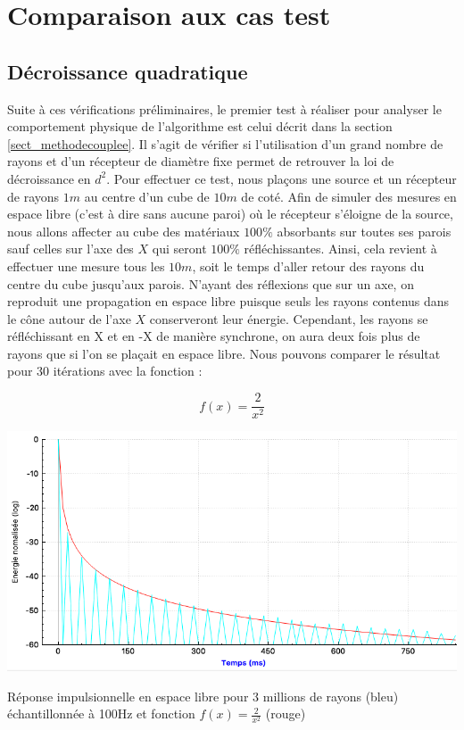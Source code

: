 \section{Comparaison aux cas test}
		\subsection{Décroissance quadratique}
Suite à ces vérifications préliminaires, le premier test à réaliser pour analyser le comportement physique de l'algorithme est celui décrit dans la section \ref{sect_methodecouplee}. Il s'agit de vérifier si l'utilisation d'un grand nombre de rayons et d'un récepteur de diamètre fixe permet de retrouver la loi de décroissance en $d^2$. Pour effectuer ce test, nous plaçons une source et un récepteur de rayons $1m$ au centre d'un cube de $10m$ de coté. Afin de simuler des mesures en espace libre (c'est à dire sans aucune paroi) où le récepteur s'éloigne de la source, nous allons affecter au cube des matériaux $100\%$ absorbants sur toutes ses parois sauf celles sur l'axe des $X$ qui seront $100\%$ réfléchissantes. Ainsi, cela revient à effectuer une mesure tous les $10m$, soit le temps d'aller retour des rayons du centre du cube jusqu'aux parois. N'ayant des réflexions que sur un axe, on reproduit une propagation en espace libre puisque seuls les rayons contenus dans le cône autour de l'axe $X$ conserveront leur énergie. Cependant, les rayons se réfléchissant en X et en -X de manière synchrone, on aura deux fois plus de rayons que si l'on se plaçait en espace libre. Nous pouvons comparer le résultat pour 30 itérations avec la fonction :

\begin{equation*}
f(x) = \frac{2}{x^2}
\end{equation*}

\begin{figureth}
	\includegraphics[width=0.8\linewidth]{images/test1}
	\caption{Réponse impulsionnelle en espace libre pour 3 millions de rayons (bleu) échantillonnée à 100Hz et fonction $f(x)=\frac{2}{x^2}$ (rouge)}
	\label{test1}
\end{figureth}

